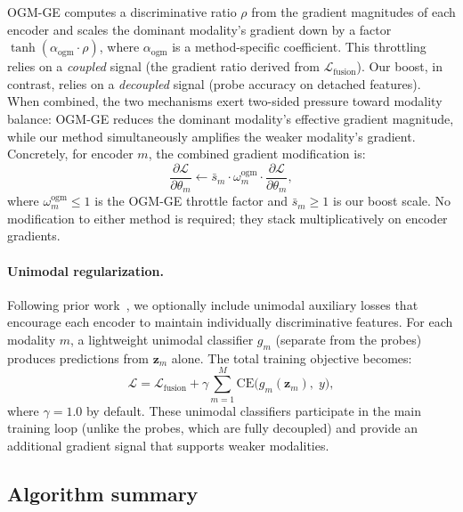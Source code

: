 \documentclass{article}
\newcommand{\loss}{\mathcal{L}}
\begin{document}
OGM-GE computes a discriminative ratio $\rho$ from the gradient magnitudes of each encoder and scales the dominant modality's gradient down by a factor $\tanh(\alpha_{\text{ogm}} \cdot \rho)$, where $\alpha_{\text{ogm}}$ is a method-specific coefficient. This throttling relies on a \emph{coupled} signal (the gradient ratio derived from $\loss_{\text{fusion}}$). Our boost, in contrast, relies on a \emph{decoupled} signal (probe accuracy on detached features). When combined, the two mechanisms exert two-sided pressure toward modality balance: OGM-GE reduces the dominant modality's effective gradient magnitude, while our method simultaneously amplifies the weaker modality's gradient. Concretely, for encoder $m$, the combined gradient modification is:
%
\begin{equation}
\label{eq:combined}
\frac{\partial \loss}{\partial \theta_m} \leftarrow \bar{s}_m \cdot \omega_m^{\text{ogm}} \cdot \frac{\partial \loss}{\partial \theta_m},
\end{equation}
%
where $\omega_m^{\text{ogm}} \leq 1$ is the OGM-GE throttle factor and $\bar{s}_m \geq 1$ is our boost scale. No modification to either method is required; they stack multiplicatively on encoder gradients.

\paragraph{Unimodal regularization.}
Following prior work~\citep{peng2022ogmge,guo2024cggm}, we optionally include unimodal auxiliary losses that encourage each encoder to maintain individually discriminative features. For each modality $m$, a lightweight unimodal classifier $g_m$ (separate from the probes) produces predictions from $\mathbf{z}_m$ alone. The total training objective becomes:
%
\begin{equation}
\label{eq:total_loss}
\loss = \loss_{\text{fusion}} + \gamma \sum_{m=1}^{M} \mathrm{CE}\!\bigl(g_m(\mathbf{z}_m),\; y\bigr),
\end{equation}
%
where $\gamma = 1.0$ by default. These unimodal classifiers participate in the main training loop (unlike the probes, which are fully decoupled) and provide an additional gradient signal that supports weaker modalities.


\subsection{Algorithm summary}
\label{sec:algorithm}
\end{document}
